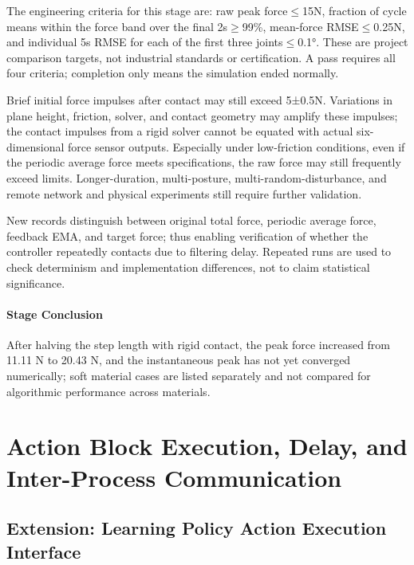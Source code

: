 The engineering criteria for this stage are: raw peak force\(\leq\)15N, fraction of cycle means within the force band over the final 2s\(\geq\)99\%, mean-force RMSE\(\leq\)0.25N, and individual 5s RMSE for each of the first three joints\(\leq\)0.1°. These are project comparison targets, not industrial standards or certification. A pass requires all four criteria; completion only means the simulation ended normally.

Brief initial force impulses after contact may still exceed 5±0.5N. Variations in plane height, friction, solver, and contact geometry may amplify these impulses; the contact impulses from a rigid solver cannot be equated with actual six-dimensional force sensor outputs. Especially under low-friction conditions, even if the periodic average force meets specifications, the raw force may still frequently exceed limits. Longer-duration, multi-posture, multi-random-disturbance, and remote network and physical experiments still require further validation.

New records distinguish between original total force, periodic average force, feedback EMA, and target force; thus enabling verification of whether the controller repeatedly contacts due to filtering delay. Repeated runs are used to check determinism and implementation differences, not to claim statistical significance.


\paragraph{Stage Conclusion} After halving the step length with rigid contact, the peak force increased from 11.11 N to 20.43 N, and the instantaneous peak has not yet converged numerically; soft material cases are listed separately and not compared for algorithmic performance across materials.


\FloatBarrier

\section{Action Block Execution, Delay, and Inter-Process Communication}

\label{stage:s16}

\subsection{Extension: Learning Policy Action Execution Interface}\label{s16-detail-1}

